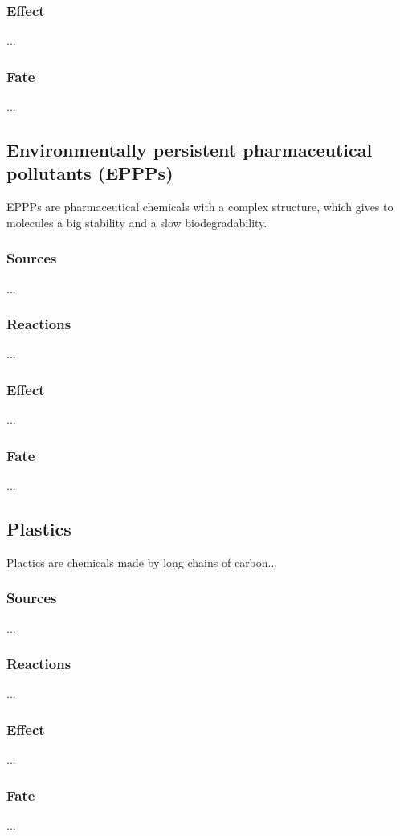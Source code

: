 \documentclass{article}
\begin{document}
\subsubsection{Effect}
...

\subsubsection{Fate}
... 

\subsection{Environmentally persistent pharmaceutical pollutants (EPPPs)}
EPPPs are pharmaceutical chemicals with a complex structure, which gives to
molecules a big stability and a slow biodegradability.

\subsubsection{Sources}
...

\subsubsection{Reactions}
...

\subsubsection{Effect}
...

\subsubsection{Fate}
... 

\subsection{Plastics}
Plactics are chemicals made by long chains of carbon...

\subsubsection{Sources}
...

\subsubsection{Reactions}
...

\subsubsection{Effect}
...

\subsubsection{Fate}
... 
\end{document}
